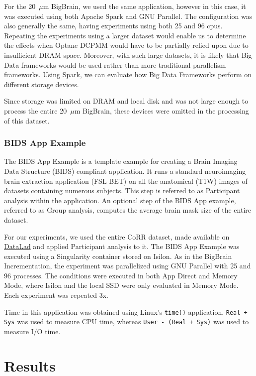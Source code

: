 \documentclass[conference]{IEEEtran}
\newcommand{\bigbrain}{BigBrain\xspace}
\begin{document}
For the 20~$\mu$m \bigbrain, we used the same application, however in this case, it was executed
using both Apache Spark and GNU Parallel. The configuration was also generally the same, having 
experiments using both 25 and 96 cpus. Repeating the experiments using a larger dataset would enable
us to determine the effects when Optane DCPMM would have to be partially relied upon due to insufficient DRAM
space. Moreover, with such large datasets, it is likely that Big Data frameworks would be used rather than
more traditional parallelism frameworks. Using Spark, we can evaluate how Big Data Frameworks perform on
different storage devices.

Since storage was limited on DRAM and local disk and was not large enough to process the entire
20~$\mu$m \bigbrain, these devices were omitted in the processing of this dataset. 

\subsubsection{BIDS App Example}

The BIDS App Example is a template example for creating a Brain Imaging Data Structure (BIDS)
compliant application. It runs a standard neuroimaging brain extraction application (FSL BET) 
on all the anatomical (T1W) images of datasets containing numerous subjects. This step is 
referred to as Participant analysis within the application. An optional
step of the BIDS App example, referred to as Group analysis, computes the average brain
mask size of the entire dataset.

For our experiments, we used the entire CoRR dataset, made available on \href{https://www.datalad.org/}{DataLad} and
applied Participant analysis to it. The BIDS App Example was executed using a Singularity container stored on
Isilon. As in the BigBrain Incrementation, the experiment was parallelized 
using GNU Parallel with 25 and 96 processes. The conditions were executed in both App Direct and Memory Mode,
where Isilon and the local SSD were only evaluated in Memory Mode. Each experiment was repeated 3x.

Time in this application was obtained using Linux's \texttt{time()} application.
\texttt{Real + Sys} was used to measure CPU time,
whereas \texttt{User - (Real + Sys)} was used to measure
I/O time.
\section{Results}
\end{document}
